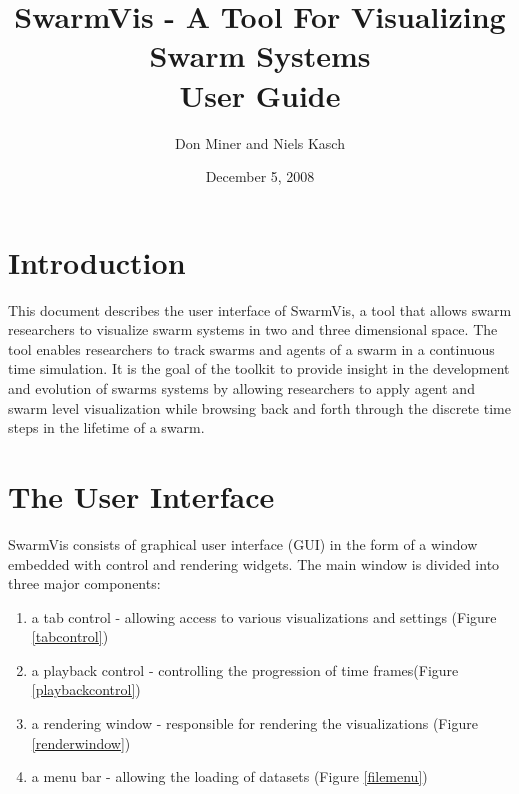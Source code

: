 \documentclass{article}
\title{\vspace{60 mm}SwarmVis - A Tool For Visualizing Swarm Systems\\User Guide}
\author{Don Miner and Niels Kasch}
\date{December 5, 2008}
\begin{document}
\maketitle
\pagebreak
\tableofcontents

\pagebreak
\section{Introduction}

This document describes the user interface of SwarmVis, a tool that allows swarm researchers to visualize swarm systems in two and three dimensional space. The tool enables researchers to track swarms and agents of a swarm in a continuous time simulation. It is the goal of the toolkit to provide insight in the development and evolution of swarms systems by allowing researchers to apply agent and swarm level visualization while browsing back and forth through the discrete time steps in the lifetime of a swarm.

\section{The User Interface}

SwarmVis consists of graphical user interface (GUI) in the form of a window embedded with control and rendering widgets. 
The main window is divided into three major components:
\begin{enumerate}
\item a tab control - allowing access to various visualizations and settings (Figure \ref{tabcontrol})
\item a playback control - controlling the progression of time frames(Figure \ref{playbackcontrol})
\item a rendering window - responsible for rendering the visualizations (Figure \ref{renderwindow})
\item a menu bar - allowing the loading of datasets (Figure \ref{filemenu})
\end{enumerate}
\end{document}
